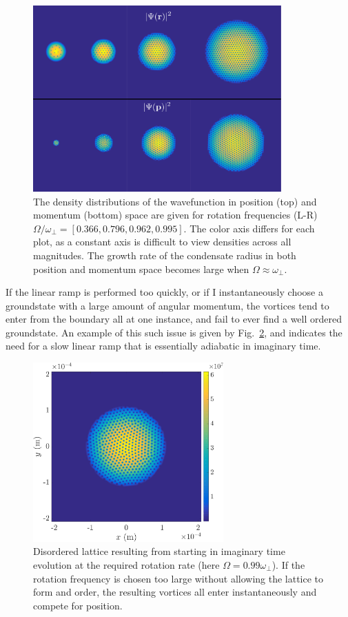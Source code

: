 \begin{figure}\centering
    \includegraphics[width=0.85\textwidth]{Images/ch4_vtx/ramp_omega.pdf}
    \caption{The density distributions of the wavefunction in position (top) and momentum (bottom) space are given for rotation frequencies (L-R) $\Omega/\omega_\perp=[0.366,0.796,0.962,0.995]$. The color axis differs for each plot, as a constant axis is difficult to view densities across all magnitudes. The growth rate of the condensate radius in both position and momentum space becomes large when $\Omega \approx \omega_\perp$.}
    \label{fig:inc_omega}
\end{figure}

If the linear ramp is performed too quickly, or if I instantaneously choose a groundstate with a large amount of angular momentum, the vortices tend to enter from the boundary all at one instance, and fail to ever find a well ordered groundstate. An example of this such issue is given by Fig.~\ref{fig:malformed_lattice}, and indicates the need for a slow linear ramp that is essentially adiabatic in imaginary time.

\begin{figure}
    \centering
    \includegraphics[width=0.65\textwidth]{Images/ch4_vtx/toofast_099_1e7}
    \caption{Disordered lattice resulting from starting in imaginary time evolution at the required rotation rate (here $\Omega=0.99\omega_\perp$). If the rotation frequency is chosen too large without allowing the lattice to form and order, the resulting vortices all enter instantaneously and compete for position. }
    \label{fig:malformed_lattice}
\end{figure}

